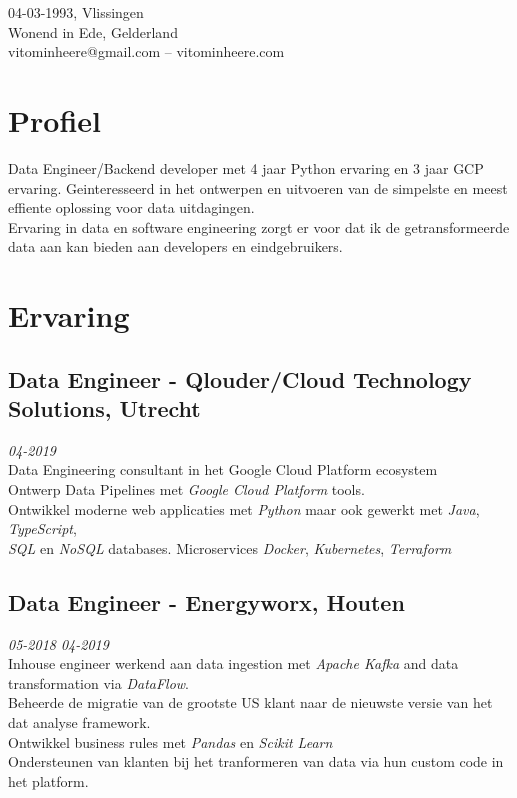 \documentclass{article}
\makeatletter
\renewcommand{\maketitle}{
\begin{center}
	{\huge\bfseries
	\theauthor}

\vspace*{1cm}

04-03-1993, Vlissingen \\
Wonend in Ede, Gelderland \\
vitominheere@gmail.com -- vitominheere.com \\

\end{center}
}
\makeatother
\begin{document}
\author{Vito Minheere}


\maketitle

\section{\sc Profiel}
Data Engineer/Backend developer met 4 jaar Python ervaring en 3 jaar GCP ervaring. Geinteresseerd in het ontwerpen en uitvoeren van de simpelste en meest effiente oplossing voor data uitdagingen. \\
Ervaring in data en software engineering zorgt er voor dat ik de getransformeerde data aan kan bieden aan developers en eindgebruikers.

\section{\sc Ervaring}
\subsection{Data Engineer - Qlouder/Cloud Technology Solutions, Utrecht} \hfill {\em 04-2019} \\
Data Engineering consultant in het Google Cloud Platform ecosystem \\
Ontwerp Data Pipelines met \emph{Google Cloud Platform} tools. \\
Ontwikkel moderne web applicaties met \emph{Python} maar ook gewerkt met \emph{Java}, \emph{TypeScript}, \\
\emph{SQL} en \emph{NoSQL} databases.
Microservices  \emph{Docker}, \emph{Kubernetes}, \emph{Terraform} \\

\subsection{Data Engineer - Energyworx, Houten} \hfill {\em 05-2018 04-2019} \\
Inhouse engineer werkend aan data ingestion met \emph{Apache Kafka} and data transformation via \emph{DataFlow}. \\
Beheerde de migratie van de grootste US klant naar de nieuwste versie van het dat analyse framework. \\
Ontwikkel business rules met \emph{Pandas} en \emph{Scikit Learn} \\
Ondersteunen van klanten bij het tranformeren van data via hun custom code in het platform. \\
\end{document}
